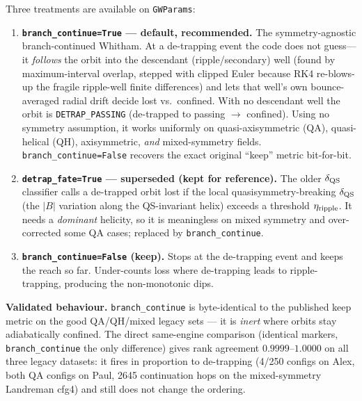 \documentclass[11pt]{article}
\newcommand{\code}[1]{\texttt{#1}}
\begin{document}
Three treatments are available on \code{GWParams}:
\begin{enumerate}[nosep,leftmargin=1.4em]
  \item \textbf{\code{branch\_continue=True} --- default, recommended.} The symmetry-agnostic
        branch-continued Whitham. At a de-trapping event the code does not guess---it
        \emph{follows} the orbit into the descendant (ripple/secondary) well (found by
        maximum-interval overlap, stepped with clipped Euler because RK4 re-blows-up the fragile
        ripple-well finite differences) and lets that well's own bounce-averaged radial drift
        decide lost vs.\ confined. With no descendant well the orbit is \code{DETRAP\_PASSING}
        (de-trapped to passing $\to$ confined). Using no symmetry assumption, it works uniformly
        on quasi-axisymmetric (QA), quasi-helical (QH), axisymmetric, \emph{and} mixed-symmetry
        fields. \code{branch\_continue=False} recovers the exact original ``keep'' metric
        bit-for-bit.
  \item \textbf{\code{detrap\_fate=True} --- superseded (kept for reference).} The older
        $\delta_{\rm QS}$ classifier calls a de-trapped orbit lost if the local
        quasisymmetry-breaking $\delta_{\rm QS}$ (the $|B|$ variation along the QS-invariant
        helix) exceeds a threshold $\eta_{\rm ripple}$. It needs a \emph{dominant} helicity, so
        it is meaningless on mixed symmetry and over-corrected some QA cases; replaced by
        \code{branch\_continue}.
  \item \textbf{\code{branch\_continue=False} (keep).} Stops at the de-trapping event and keeps
        the reach so far. Under-counts loss where de-trapping leads to ripple-trapping, producing
        the non-monotonic dips.
\end{enumerate}

\textbf{Validated behaviour.} \code{branch\_continue} is byte-identical to the published keep
metric on the good QA/QH/mixed legacy sets --- it is \emph{inert} where orbits stay adiabatically
confined. The direct same-engine comparison (identical markers, \code{branch\_continue} the only
difference) gives rank agreement $\mathbf{0.9999}$--$\mathbf{1.0000}$ on all three legacy datasets:
it fires in proportion to de-trapping (4/250 configs on Alex, both QA configs on Paul, 2645
continuation hops on the mixed-symmetry Landreman cfg4) and still does not change the ordering.
\end{document}
